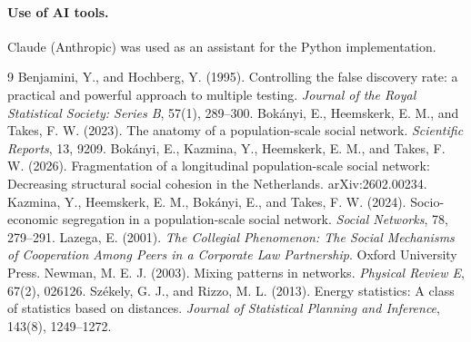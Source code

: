 \documentclass[11pt]{article}
\begin{document}
\paragraph{Use of AI tools.} Claude (Anthropic) was used as an assistant for the Python implementation.

\begin{thebibliography}{9}
\setlength{\itemsep}{0.15em}\small
{} Benjamini, Y., and Hochberg, Y. (1995). Controlling the false discovery rate: a practical and powerful approach to multiple testing. \emph{Journal of the Royal Statistical Society: Series B}, 57(1), 289--300.
 Bok\'anyi, E., Heemskerk, E. M., and Takes, F. W. (2023). The anatomy of a population-scale social network. \emph{Scientific Reports}, 13, 9209.
 Bok\'anyi, E., Kazmina, Y., Heemskerk, E. M., and Takes, F. W. (2026). Fragmentation of a longitudinal population-scale social network: Decreasing structural social cohesion in the Netherlands. arXiv:2602.00234.
 Kazmina, Y., Heemskerk, E. M., Bok\'anyi, E., and Takes, F. W. (2024). Socio-economic segregation in a population-scale social network. \emph{Social Networks}, 78, 279--291.
 Lazega, E. (2001). \emph{The Collegial Phenomenon: The Social Mechanisms of Cooperation Among Peers in a Corporate Law Partnership}. Oxford University Press.
 Newman, M. E. J. (2003). Mixing patterns in networks. \emph{Physical Review E}, 67(2), 026126.
 Sz\'ekely, G. J., and Rizzo, M. L. (2013). Energy statistics: A class of statistics based on distances. \emph{Journal of Statistical Planning and Inference}, 143(8), 1249--1272.
\end{thebibliography}
\end{document}
